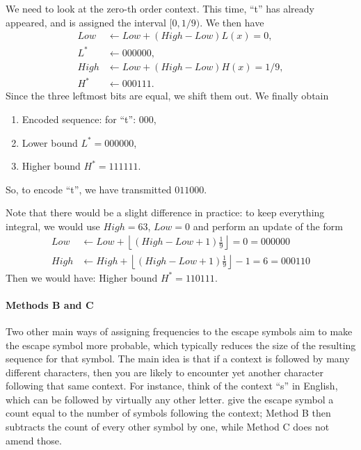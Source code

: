 \documentclass[a4paper, 11pt, openany]{book}
\begin{document}
We need to look at the zero-th order context. This time, ``t'' has already appeared, and is assigned the interval $[0, 1/9 )$. We then have
\begin{align*}
    Low &\gets Low + (High - Low) L(x) = 0,\\
    L^* &\gets 000000,\\
    High & \gets Low + (High - Low) H(x) = 1/9,\\
    H^* &\gets 000111.
\end{align*}
Since the three leftmost bits are equal, we shift them out. We finally obtain
\begin{enumerate}
    \item Encoded sequence: for ``t'': $000$,

    \item Lower bound $L^* = 000000$,

    \item Higher bound $H^* = 111111$.
\end{enumerate}
So, to encode ``\textvisiblespace t'', we have transmitted $011000$.

Note that there would be a slight difference in practice: to keep everything integral, we would use $High = 63$, $Low = 0$ and perform an update of the form
\begin{align*}
    Low &\gets Low + \left\lfloor (High - Low + 1) \frac{ 1 }{ 9 }  \right\rfloor  = 0 = 000000\\
    High & \gets High + \left\lfloor (High - Low + 1) \frac{ 1 }{ 9 }  \right\rfloor - 1  = 6 = 000110
\end{align*}
Then we would have: Higher bound $H^* = 110111$.



\paragraph{Methods B and C} Two other main ways of assigning frequencies to the escape symbols aim to make the escape symbol more probable, which typically reduces the size of the resulting sequence for that symbol. The main idea is that if a context is followed by many different characters, then you are likely to encounter yet another character following that same context. For instance, think of the context ``s'' in English, which can be followed by virtually any other letter.  give the escape symbol a count equal to the number of symbols following the context; Method B then subtracts the count of every other symbol by one, while Method C does not amend those.
\end{document}
